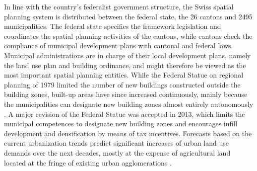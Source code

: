 \documentclass[10pt,letterpaper]{article}
\begin{document}
In line with the country's federalist government structure, the Swiss spatial planning system is distributed between the federal state, the 26 cantons and 2495 municipalities. The federal state specifies the framework legislation and coordinates the spatial planning activities of the cantons, while cantons check the compliance of municipal development plans with cantonal and federal laws. Municipal administrations are in charge of their local development plans, namely the land use plan and building ordinance, and might therefore be viewed as the most important spatial planning entities.
While the Federal Statue on regional planning of 1979 limited the number of new buildings constructed outside the building zones, built-up areas have since increased continuously, mainly because the municipalities can designate new building zones almost entirely autonomously \cite{jaeger2014improving}. A major revision of the Federal Statue was accepted in 2013, which limits the municipal competences to designate new building zones and encourages infill development and densification by means of tax incentives.
Forecasts based on the current urbanization trends predict significant increases of urban land use demands over the next decades, mostly at the expense of agricultural land located at the fringe of existing urban agglomerations \cite{price2015future}.
\end{document}
